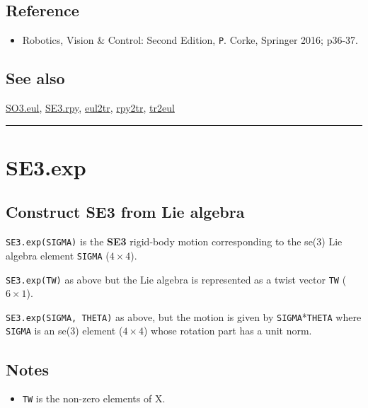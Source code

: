 \subsection*{Reference}
\begin{itemize}
  \item Robotics, Vision \& Control: Second Edition, \texttt{P}. Corke, Springer 2016; p36-37.
\end{itemize}

\subsection*{See also}


\hyperlink{SO3.eul}{\color{blue} SO3.eul}, \hyperlink{SE3.rpy}{\color{blue} SE3.rpy}, \hyperlink{eul2tr}{\color{blue} eul2tr}, \hyperlink{rpy2tr}{\color{blue} rpy2tr}, \hyperlink{tr2eul}{\color{blue} tr2eul}

\vspace{1.5ex}\hrule

\hypertarget{SE3.exp}{\section*{SE3.exp}}
\subsection*{Construct SE3 from Lie algebra}


\texttt{SE3.exp(SIGMA)} is the \textbf{\color{red} SE3} rigid-body motion corresponding to the se(3)
Lie algebra element \texttt{SIGMA} ($4 \times 4$).



\texttt{SE3.exp(TW)} as above but the Lie algebra is represented
as a twist vector \texttt{TW} ($6 \times 1$).



\texttt{SE3.exp(SIGMA, THETA)} as above, but the motion is given by \texttt{SIGMA}*\texttt{THETA}
where \texttt{SIGMA} is an se(3) element ($4 \times 4$) whose rotation part has a unit norm.


\subsection*{Notes}
\begin{itemize}
  \item \texttt{TW} is the non-zero elements of X.
\end{itemize}

